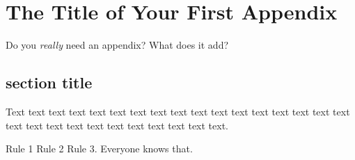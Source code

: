 \chapter{The Title of Your First Appendix}
\label{ap: app1}

Do you \textit{really} need an appendix? What does it add?

\section{section title}
Text text text text text text text text text text text text text text
text text text text text text text text text text text text text text. 

Rule 1 Rule 2 Rule 3. Everyone knows that.
